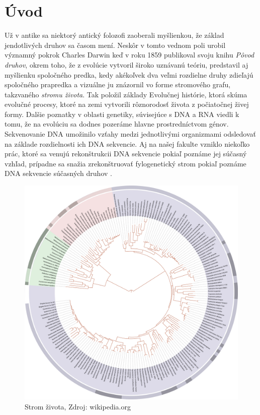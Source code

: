 \chapter*{Úvod}
Už v antike sa niektorý antický folozofi zaoberali myšlienkou, že základ jendotlivých druhov sa časom mení.
Neskôr v tomto vednom poli urobil významný pokrok Charles Darwin keď v roku 1859 publikoval svoju knihu \emph{Pôvod druhov},
okrem toho, že z evolúcie vytvoril široko uznávanú teóriu, predstavil aj myšlienku spoločného predka, kedy akékoľvek dva veľmi rozdielne
druhy zdieľajú spoločného prapredka a vizuálne ju znázornil vo forme stromového grafu, takzvaného \emph{stromu života}.
Tak položil základy Evolučnej histórie, ktorá skúma evolučné procesy, ktoré
na zemi vytvorili rôznorodosť života z počiatočnej živej formy. 
Dalšie poznatky v oblasti genetiky, súvisejúce s DNA a RNA viedli k tomu, že na evolúciu sa
dodnes pozeráme hlavne prostredníctvom génov.
Sekvenovanie DNA umožinilo vzťahy medzi jednotlivými organizmami odsledovať na základe rozdielnosti ich DNA sekvencie.
Aj na našej fakulte vzniklo niekoľko prác, ktoré sa venujú rekonštrukcii DNA sekvencie pokiaľ poznáme jej súčasný vzhľad,
prípadne sa snažia zrekonštruovať fylogenetický strom pokiaľ poznáme DNA sekvencie súčasných druhov 
\cite{Kovac2011,Hozza2014,Herencsar2014,Vinar2010}. 
\begin{figure}[t]
 \centering
\includegraphics[width=1\textwidth]{images/tol}
\caption{Strom života, Zdroj: wikipedia.org}\label{obr:tol}
\end{figure}

